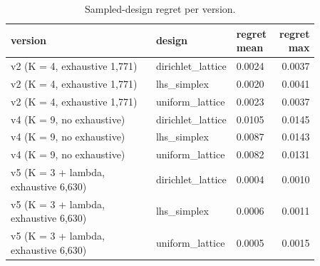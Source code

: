 \begin{table}[htbp]
\centering\scriptsize
\caption{Sampled-design regret per version.}
\label{tab:cmp_designs}
\setlength{\tabcolsep}{3pt}
\begin{tabular}{p{0.492\linewidth}p{0.226\linewidth}p{0.146\linewidth}r}
\toprule
version & design & regret mean & regret max \\
\midrule
v2 (K = 4, exhaustive 1,771) & dirichlet\_\allowbreak{}lattice & 0.0024 & 0.0037 \\
v2 (K = 4, exhaustive 1,771) & lhs\_\allowbreak{}simplex & 0.0020 & 0.0041 \\
v2 (K = 4, exhaustive 1,771) & uniform\_\allowbreak{}lattice & 0.0023 & 0.0037 \\
v4 (K = 9, no exhaustive) & dirichlet\_\allowbreak{}lattice & 0.0105 & 0.0145 \\
v4 (K = 9, no exhaustive) & lhs\_\allowbreak{}simplex & 0.0087 & 0.0143 \\
v4 (K = 9, no exhaustive) & uniform\_\allowbreak{}lattice & 0.0082 & 0.0131 \\
v5 (K = 3 + lambda, exhaustive 6,630) & dirichlet\_\allowbreak{}lattice & 0.0004 & 0.0010 \\
v5 (K = 3 + lambda, exhaustive 6,630) & lhs\_\allowbreak{}simplex & 0.0006 & 0.0011 \\
v5 (K = 3 + lambda, exhaustive 6,630) & uniform\_\allowbreak{}lattice & 0.0005 & 0.0015 \\
\bottomrule
\end{tabular}
\end{table}
